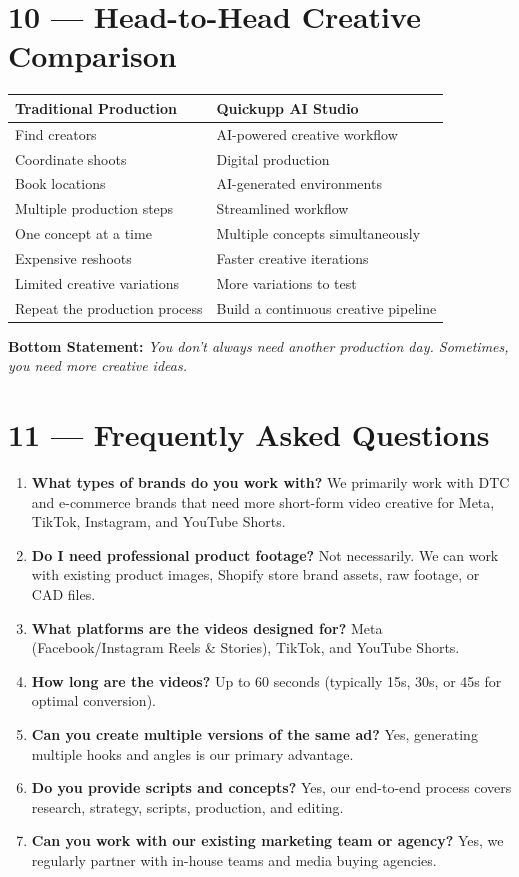 \documentclass[11pt,a4paper]{article}
\begin{document}
\section{10 --- Head-to-Head Creative Comparison}
\begin{table}[h!]
\centering
\begin{tabular}{p{} | p{}}
\toprule
\textbf{Traditional Production} & \textbf{Quickupp AI Studio} \\
\midrule
Find creators & AI-powered creative workflow \\
Coordinate shoots & Digital production \\
Book locations & AI-generated environments \\
Multiple production steps & Streamlined workflow \\
One concept at a time & Multiple concepts simultaneously \\
Expensive reshoots & Faster creative iterations \\
Limited creative variations & More variations to test \\
Repeat the production process & Build a continuous creative pipeline \\
\bottomrule
\end{tabular}
\end{table}
\textbf{Bottom Statement:} \textit{You don't always need another production day. Sometimes, you need more creative ideas.}

\section{11 --- Frequently Asked Questions}
\begin{enumerate}
    \item \textbf{What types of brands do you work with?} We primarily work with DTC and e-commerce brands that need more short-form video creative for Meta, TikTok, Instagram, and YouTube Shorts.
    \item \textbf{Do I need professional product footage?} Not necessarily. We can work with existing product images, Shopify store brand assets, raw footage, or CAD files.
    \item \textbf{What platforms are the videos designed for?} Meta (Facebook/Instagram Reels \& Stories), TikTok, and YouTube Shorts.
    \item \textbf{How long are the videos?} Up to 60 seconds (typically 15s, 30s, or 45s for optimal conversion).
    \item \textbf{Can you create multiple versions of the same ad?} Yes, generating multiple hooks and angles is our primary advantage.
    \item \textbf{Do you provide scripts and concepts?} Yes, our end-to-end process covers research, strategy, scripts, production, and editing.
    \item \textbf{Can you work with our existing marketing team or agency?} Yes, we regularly partner with in-house teams and media buying agencies.
\end{enumerate}
\end{document}
